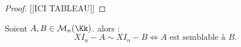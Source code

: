 \documentclass[class=report,crop=false]{standalone}
\newcommand{\sta}{\stackrel}
\begin{document}
\begin{proof}

[[ICI TABLEAU]]

%
\end{proof}

\begin{lemme}\label{lem:eqsem}
Soient $A,B \in \mathcal{M}_n(\Kk)$. alors :
\[XI_n-A \sim XI_n-B \iff \mbox{$A$ est semblable à $B$.}\]
\end{lemme}
\end{document}
